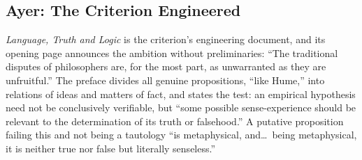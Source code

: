 \subsection{Ayer: The Criterion Engineered}

\emph{Language, Truth and Logic} is the criterion's engineering document, and its opening page announces the ambition without preliminaries: ``The traditional disputes of philosophers are, for the most part, as unwarranted as they are unfruitful.'' The preface divides all genuine propositions, ``like Hume,'' into relations of ideas and matters of fact, and states the test: an empirical hypothesis need not be conclusively verifiable, but ``some possible sense-experience should be relevant to the determination of its truth or falsehood.'' A putative proposition failing this and not being a tautology ``is metaphysical, and\ldots\ being metaphysical, it is neither true nor false but literally senseless.''

